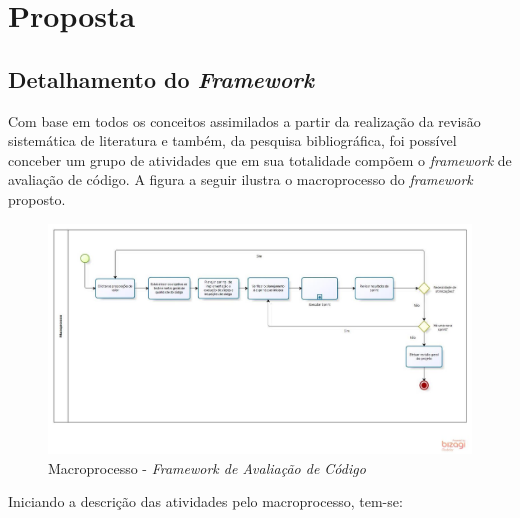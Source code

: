 \chapter{Proposta}

\section{Detalhamento do \textit{Framework}}

Com base em todos os conceitos assimilados a partir da realização da revisão sistemática de literatura e também, da pesquisa bibliográfica, foi possível conceber um grupo de atividades que em sua totalidade compõem o \textit{framework} de avaliação de código. A figura a seguir ilustra o macroprocesso do \textit{framework} proposto.

\begin{figure}[h]
\includegraphics[width=\textwidth]{figuras/macroprocesso.jpg}
\caption{Macroprocesso - \textit{Framework de Avaliação de Código}}
\end{figure}

Iniciando a descrição das atividades pelo macroprocesso, tem-se:

